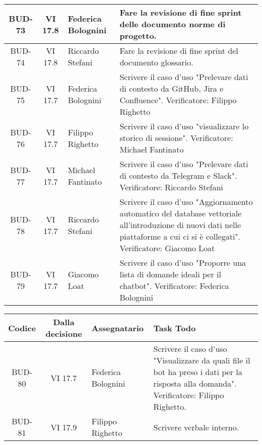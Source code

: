 \begin{table}[htbp]
\begin{tabular}{|c|c|p{}|p{}|}
    \hline
    BUD-73 & VI 17.8 & Federica Bolognini & Fare la revisione di fine sprint delle documento norme di progetto. \\
    \hline
    BUD-74 & VI 17.8 & Riccardo Stefani & Fare la revisione di fine sprint del documento glossario. \\
    \hline
    BUD-75 & VI 17.7 & Federica Bolognini & Scrivere il caso d'uso "Prelevare dati di contesto da GitHub, Jira e Confluence". Verificatore: Filippo Righetto \\
    \hline
    BUD-76 & VI 17.7 & Filippo Righetto & Scrivere il caso d'uso "visualizzare lo storico di sessione". Verificatore: Michael Fantinato \\
    \hline
    BUD-77 & VI 17.7 & Michael Fantinato & Scrivere il caso d'uso "Prelevare dati di contesto da Telegram e Slack". Verificatore: Riccardo Stefani\\
    \hline
    BUD-78 & VI 17.7 & Riccardo Stefani & Scrivere il caso d'uso "Aggiornamento automatico del database vettoriale all'introduzione di nuovi dati nelle piattaforme a cui ci si è collegati". Verificatore: Giacomo Loat\\
    \hline
    BUD-79 & VI 17.7 & Giacomo Loat & Scrivere il caso d'uso "Proporre una lista di domande ideali per il chatbot". Verificatore: Federica Bolognini\\
    \hline
\end{tabular}
\end{table}

\vspace{0.5cm}
\newpage
\begin{table}[htbp]
\centering
{}
\begin{tabular}{|c|c|p{}|p{}|}
    \hline
    \rowcolor[gray]{0.75}
    \textbf{Codice} & \textbf{Dalla decisione} & \textbf{Assegnatario} & \textbf{Task Todo} \\ 
    \hline
    BUD-80 & VI 17.7 & Federica Bolognini & Scrivere il caso d'uso "Visualizzare da quali file il bot ha preso i dati per la risposta alla domanda". Verificatore: Filippo Righetto. \\ 
    \hline
    BUD-81 & VI 17.9 & Filippo Righetto & Scrivere verbale interno. \\ 
    \hline
\end{tabular}
\end{table}


